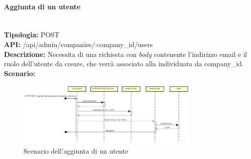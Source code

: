 \newpage
\paragraph{Aggiunta di un utente}\mbox{}\\
\textbf{Tipologia:} POST \\
\textbf{API:} /api/admin/companies/:company\_id/users \\
\textbf{Descrizione:} Necessita di una richiesta con \textit{body} contenente l'indirizzo email e il ruolo dell'utente da creare, che verrà associato alla  individuata da company\_id. \\
\textbf{Scenario:} 
\begin{figure}[H]
\centering
\includegraphics[width=0.8\textwidth]{res/sections/backend/sequence/(POST)userSA.png}
\caption{Scenario dell'aggiunta di un utente}
\end{figure}
